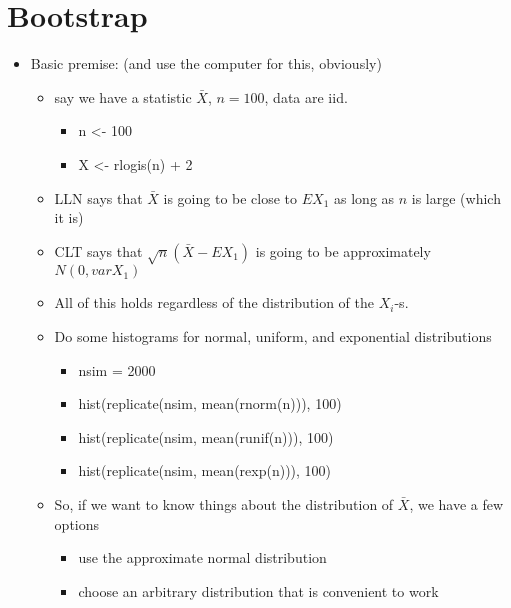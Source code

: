 
\part*{Bootstrap}%

\begin{itemize}
\item Basic premise: (and use the computer for this, obviously)
\begin{itemize}
\item say we have a statistic $\bar X$, $n = 100$, data are iid.
\begin{itemize}
\item n <- 100
\item X <- rlogis(n) + 2
\end{itemize}
\item LLN says that $\bar X$ is going to be close to $E X_1$ as long
       as $n$ is large (which it is)
\item CLT says that $\sqrt{n} (\bar X - E X_1)$ is going to be
       approximately $N(0, var X_1)$
\item All of this holds regardless of the distribution of the
       $X_i$-s.
\item Do some histograms for normal, uniform, and exponential distributions
\begin{itemize}
\item nsim = 2000
\item hist(replicate(nsim, mean(rnorm(n))), 100)
\item hist(replicate(nsim, mean(runif(n))), 100)
\item hist(replicate(nsim, mean(rexp(n))), 100)
\end{itemize}
\item So, if we want to know things about the distribution of $\bar
       X$, we have a few options
\begin{itemize}
\item use the approximate normal distribution
\item choose an arbitrary distribution that is convenient to work

\end{itemize}
\end{itemize}
\end{itemize}
